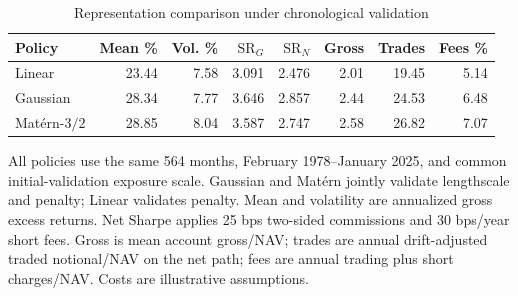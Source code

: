 \begin{table}[!htbp]\centering\small\setlength{\tabcolsep}{5pt}
\caption{Representation comparison under chronological validation}\label{tab:kernel_performance}
\begin{tabular}{@{}lrrrrrrr@{}}\toprule
Policy & Mean \% & Vol. \% & $\mathrm{SR}_G$ & $\mathrm{SR}_N$ & Gross & Trades & Fees \% \\ \midrule
Linear & 23.44 & 7.58 & 3.091 & 2.476 & 2.01 & 19.45 & 5.14 \\
Gaussian & 28.34 & 7.77 & 3.646 & 2.857 & 2.44 & 24.53 & 6.48 \\
Mat\'ern-$3/2$ & 28.85 & 8.04 & 3.587 & 2.747 & 2.58 & 26.82 & 7.07 \\
\bottomrule\end{tabular}\par\vspace{5pt}
\begin{minipage}{\textwidth}\footnotesize All policies use the same 564 months, February 1978--January 2025, and common initial-validation exposure scale. Gaussian and Mat\'ern jointly validate lengthscale and penalty; Linear validates penalty. Mean and volatility are annualized gross excess returns. Net Sharpe applies 25 bps two-sided commissions and 30 bps/year short fees. Gross is mean account gross/NAV; trades are annual drift-adjusted traded notional/NAV on the net path; fees are annual trading plus short charges/NAV. Costs are illustrative assumptions.\end{minipage}\end{table}
